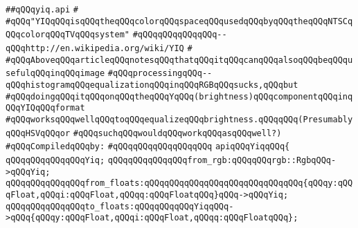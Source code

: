 \label{src/lib/x-kit/xclient/src/color/yiq.api}
\verb|##qQQqyiq.api|\newline
\verb|#|\newline
\verb|#qQQq"YIQqQQqisqQQqtheqQQqcolorqQQqspaceqQQqusedqQQqbyqQQqtheqQQqNTSCqQQqcolorqQQqTVqQQqsystem"|\newline
\verb|#qQQqqQQqqQQqqQQq--qQQqhttp://en.wikipedia.org/wiki/YIQ|\newline
\verb|#|\newline
\verb|#qQQqAboveqQQqarticleqQQqnotesqQQqthatqQQqitqQQqcanqQQqalsoqQQqbeqQQqusefulqQQqinqQQqimage|\newline
\verb|#qQQqprocessingqQQq--qQQqhistogramqQQqequalizationqQQqinqQQqRGBqQQqsucks,qQQqbut|\newline
\verb|#qQQqdoingqQQqitqQQqonqQQqtheqQQqYqQQq(brightness)qQQqcomponentqQQqinqQQqYIQqQQqformat|\newline
\verb|#qQQqworksqQQqwellqQQqtoqQQqequalizeqQQqbrightness.qQQqqQQq(PresumablyqQQqHSVqQQqor|\newline
\verb|#qQQqsuchqQQqwouldqQQqworkqQQqasqQQqwell?)|\newline
\newline
\verb|#qQQqCompiledqQQqby:|\newline
\verb|#qQQqqQQqqQQqqQQqqQQq|\newline
\newline
\newline
\newline
\newline
\newline
\newline
\verb|apiqQQqYiqqQQq{|\newline
\newline
\verb|qQQqqQQqqQQqqQQqYiq;|\newline
\newline
\verb|qQQqqQQqqQQqqQQqfrom_rgb:qQQqqQQqrgb::RgbqQQq->qQQqYiq;|\newline
\newline
\verb|qQQqqQQqqQQqqQQqfrom_floats:qQQqqQQqqQQqqQQqqQQqqQQqqQQqqQQq{qQQqy:qQQqFloat,qQQqi:qQQqFloat,qQQqq:qQQqFloatqQQq}qQQq->qQQqYiq;|\newline
\verb|qQQqqQQqqQQqqQQqto_floats:qQQqqQQqqQQqYiqqQQq->qQQq{qQQqy:qQQqFloat,qQQqi:qQQqFloat,qQQqq:qQQqFloatqQQq};|\newline
\newline
\newline
